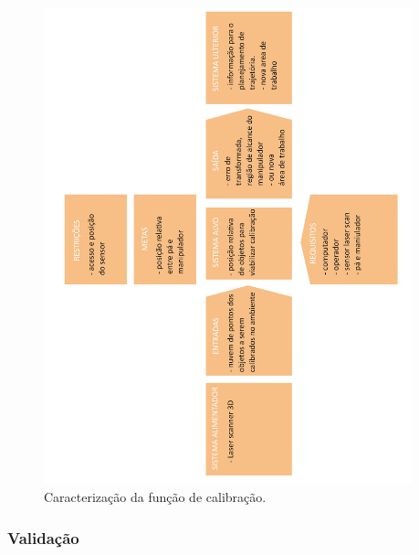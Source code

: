 \documentclass[12pt,a4paper]{article}
\begin{document}
\begin{figure}[H]
\begin{center}
  \includegraphics[width=0.95\textwidth]{figs/caracterizacao_calibracao.jpg}
  \caption{Caracterização da função de calibração.}
  \label{fig:caracterizacao_calibracao}
\end{center}
\end{figure} 

\subsubsection {Validação}
\end{document}
